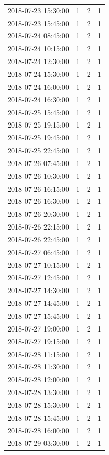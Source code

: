 \begin{tabular}{lrrr}
2018-07-23 15:30:00 & 1 & 2 & 1 \\
2018-07-23 15:45:00 & 1 & 2 & 1 \\
2018-07-24 08:45:00 & 1 & 2 & 1 \\
2018-07-24 10:15:00 & 1 & 2 & 1 \\
2018-07-24 12:30:00 & 1 & 2 & 1 \\
2018-07-24 15:30:00 & 1 & 2 & 1 \\
2018-07-24 16:00:00 & 1 & 2 & 1 \\
2018-07-24 16:30:00 & 1 & 2 & 1 \\
2018-07-25 15:45:00 & 1 & 2 & 1 \\
2018-07-25 19:15:00 & 1 & 2 & 1 \\
2018-07-25 19:45:00 & 1 & 2 & 1 \\
2018-07-25 22:45:00 & 1 & 2 & 1 \\
2018-07-26 07:45:00 & 1 & 2 & 1 \\
2018-07-26 10:30:00 & 1 & 2 & 1 \\
2018-07-26 16:15:00 & 1 & 2 & 1 \\
2018-07-26 16:30:00 & 1 & 2 & 1 \\
2018-07-26 20:30:00 & 1 & 2 & 1 \\
2018-07-26 22:15:00 & 1 & 2 & 1 \\
2018-07-26 22:45:00 & 1 & 2 & 1 \\
2018-07-27 06:45:00 & 1 & 2 & 1 \\
2018-07-27 10:15:00 & 1 & 2 & 1 \\
2018-07-27 12:45:00 & 1 & 2 & 1 \\
2018-07-27 14:30:00 & 1 & 2 & 1 \\
2018-07-27 14:45:00 & 1 & 2 & 1 \\
2018-07-27 15:45:00 & 1 & 2 & 1 \\
2018-07-27 19:00:00 & 1 & 2 & 1 \\
2018-07-27 19:15:00 & 1 & 2 & 1 \\
2018-07-28 11:15:00 & 1 & 2 & 1 \\
2018-07-28 11:30:00 & 1 & 2 & 1 \\
2018-07-28 12:00:00 & 1 & 2 & 1 \\
2018-07-28 13:30:00 & 1 & 2 & 1 \\
2018-07-28 15:30:00 & 1 & 2 & 1 \\
2018-07-28 15:45:00 & 1 & 2 & 1 \\
2018-07-28 16:00:00 & 1 & 2 & 1 \\
2018-07-29 03:30:00 & 1 & 2 & 1 \\

\end{tabular}
